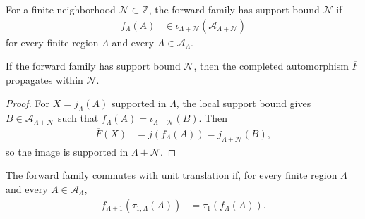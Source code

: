 \begin{definition}
    \label{def:qca_compatible_local_support_bound}
    \leanok
    For a finite neighborhood $\mathcal N\subset\mathbb Z$, the forward family
    has support bound $\mathcal N$ if
    \begin{align}
        f_\Lambda(A) & \in
        \iota_{\Lambda+\mathcal N}
        (\mathcal A_{\Lambda+\mathcal N})
    \end{align}
    for every finite region $\Lambda$ and every $A\in\mathcal A_\Lambda$.
\end{definition}

\begin{lemma}
    \label{thm:qca_compatible_local_propagation}
    \leanok
    If the forward family has support bound $\mathcal N$, then the completed
    automorphism $\overline F$ propagates within $\mathcal N$.
\end{lemma}

\begin{proof}\leanok
    For $X=j_\Lambda(A)$ supported in $\Lambda$, the local support bound gives
    $B\in\mathcal A_{\Lambda+\mathcal N}$ such that
    $f_\Lambda(A)=\iota_{\Lambda+\mathcal N}(B)$.  Then
    \begin{align}
        \overline F(X)
         & =j(f_\Lambda(A))
        =j_{\Lambda+\mathcal N}(B),
    \end{align}
    so the image is supported in $\Lambda+\mathcal N$.
\end{proof}

\begin{definition}
    \label{def:qca_compatible_local_unit_translation}
    \leanok
    The forward family commutes with unit translation if, for every finite
    region $\Lambda$ and every $A\in\mathcal A_\Lambda$,
    \begin{align}
        f_{\Lambda+1}(\tau_{1,\Lambda}(A))
         & =\tau_1(f_\Lambda(A)).
    \end{align}
\end{definition}

